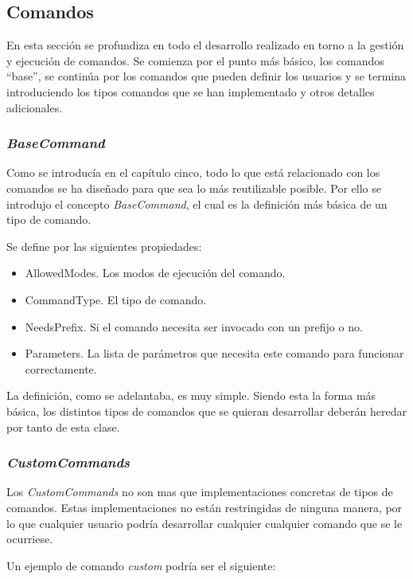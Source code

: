 \subsection{Comandos}

En esta sección se profundiza en todo el desarrollo realizado en torno a la gestión y ejecución de comandos. Se comienza por el punto más básico, los comandos ``base'', se continúa por los comandos que pueden definir los usuarios y se termina introduciendo los tipos comandos que se han implementado y otros detalles adicionales.

\subsubsection{\textit{BaseCommand}}

Como se introducía en el capítulo cinco, todo lo que está relacionado con los comandos se ha diseñado para que sea lo más reutilizable posible. Por ello se introdujo el concepto \textit{BaseCommand}, el cual es la definición más básica de un tipo de comando.

Se define por las siguientes propiedades:

\begin{itemize}
	\item AllowedModes. Los modos de ejecución del comando.
	\item CommandType. El tipo de comando.
	\item NeedsPrefix. Si el comando necesita ser invocado con un prefijo o no.
	\item Parameters. La lista de parámetros que necesita este comando para funcionar correctamente.
\end{itemize}

La definición, como se adelantaba, es muy simple. Siendo esta la forma más básica, los distintos tipos de comandos que se quieran desarrollar deberán heredar por tanto de esta clase.


\subsubsection{\textit{CustomCommands}}

Los \textit{CustomCommands} no son mas que implementaciones concretas de tipos de comandos. Estas implementaciones no están restringidas de ninguna manera, por lo que cualquier usuario podría desarrollar cualquier cualquier comando que se le ocurriese.

Un ejemplo de comando \textit{custom} podría ser el siguiente:


